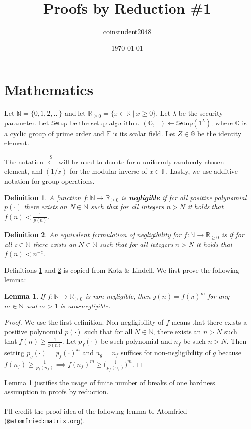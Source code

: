 \documentclass{article}
\title{Proofs by Reduction \#1}
\author{coinstudent2048}
\date{\today}
\newtheorem{definition}{Definition}[section]
\newtheorem{lemma}[theorem]{Lemma}
\begin{document}
\maketitle


\section{Mathematics}
Let $\mathbb{N}=\{0,1,2,\ldots\}$ and let $\mathbb{R}_{\ge 0}=\{x\in\mathbb{R}\mid x\ge 0\}$. Let $\lambda$ be the security parameter. Let $\textsf{Setup}$ be the setup algorithm: $(\mathbb{G}, \mathbb{F})\leftarrow\textsf{Setup}(1^{\lambda})$, where $\mathbb{G}$ is a cyclic group of prime order and $\mathbb{F}$ is its scalar field. Let $Z\in\mathbb{G}$ be the identity element.

The notation $\xleftarrow{\$}$ will be used to denote for a uniformly randomly chosen element, and $(1/x)$ for the modular inverse of $x\in\mathbb{F}$. Lastly, we use additive notation for group operations.

\begin{definition}\label{negl1}
A function $f:\mathbb{N}\rightarrow\mathbb{R}_{\ge 0}$ is \textbf{\em negligible} if for all positive polynomial $p(\cdot)$ there exists an $N\in\mathbb{N}$ such that for all integers $n>N$ it holds that $f(n)<\frac{1}{p(n)}$.
\end{definition}

\begin{definition}\label{negl2}
An equivalent formulation of negligibility for $f:\mathbb{N}\rightarrow\mathbb{R}_{\ge 0}$ is if for all $c\in\mathbb{N}$ there exists an $N\in\mathbb{N}$ such that for all integers $n>N$ it holds that $f(n)<n^{-c}$.
\end{definition}

\noindent Definitions \ref{negl1} and \ref{negl2} is copied from Katz \& Lindell. We first prove the following lemma:

\begin{lemma}\label{negl-exp}
If $f:\mathbb{N}\rightarrow\mathbb{R}_{\ge 0}$ is non-negligible, then $g(n)=f(n)^m$ for any $m\in\mathbb{N}$ and $m>1$ is non-negligible.
\end{lemma}
\begin{proof}
We use the first definition. Non-negligibility of $f$ means that there exists a positive polynomial $p(\cdot)$ such that for all $N\in\mathbb{N}$, there exists an $n>N$ such that $f(n)\ge\frac{1}{p(n)}$. Let $p_f(\cdot)$ be such polynomial and $n_f$ be such $n>N$. Then setting $p_g(\cdot)=p_f(\cdot)^m$ and $n_g=n_f$ suffices for non-negligibility of $g$ because $f(n_f)\ge\frac{1}{p_f(n_f)}\implies f(n_f)^m\ge\big(\frac{1}{p_f(n_f)}\big)^m$.
\end{proof}
\noindent Lemma \ref{negl-exp} justifies the usage of finite number of breaks of one hardness assumption in proofs by reduction.
\\\\
\noindent I'll credit the proof idea of the following lemma to Atomfried (\texttt{@atomfried:matrix.org}).
\end{document}

